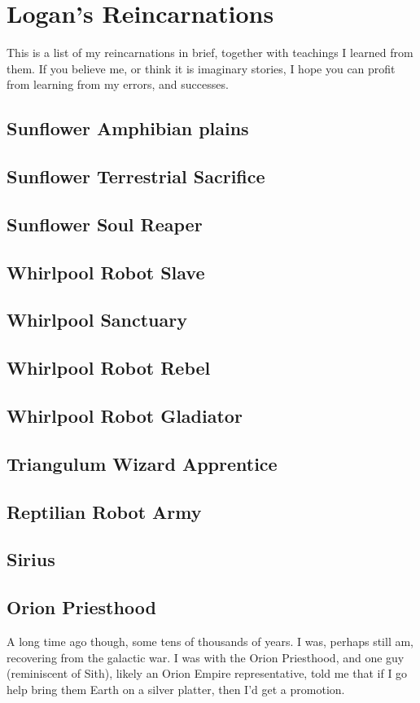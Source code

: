 \part{Logan's Reincarnations}\label{reincarnation}

This is a list of my reincarnations in brief, together with teachings I learned
from them. 
If you believe me, or think it is imaginary stories, 
I hope you can profit from learning from my errors, and successes.

\chapter{Sunflower Amphibian plains}
\chapter{Sunflower Terrestrial Sacrifice}
\chapter{Sunflower Soul Reaper}
\chapter{Whirlpool Robot Slave}
\chapter{Whirlpool Sanctuary}
\chapter{Whirlpool Robot Rebel}
\chapter{Whirlpool Robot Gladiator}
\chapter{Triangulum Wizard Apprentice}
\chapter{Reptilian Robot Army}
\chapter{Sirius}
\chapter{Orion Priesthood}
A long time ago though, some tens of thousands of years. I was, perhaps still am, recovering from the galactic war. I was with the Orion Priesthood, and one guy (reminiscent of Sith), likely an Orion Empire representative, told me that if I go help bring them Earth on a silver platter, then I'd get a promotion.

